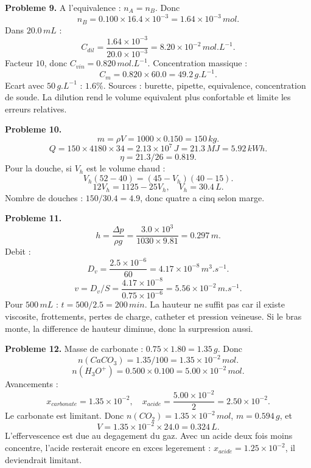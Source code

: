 \documentclass[11pt,a4paper]{article}
\begin{document}
\begin{corrige}
\textbf{Probleme 9.}
A l'equivalence : \(n_A=n_B\). Donc
\[
n_B=0.100\times16.4\times10^{-3}=1.64\times10^{-3}\,mol.
\]
Dans \(20.0\,mL\) :
\[
C_{dil}=\frac{1.64\times10^{-3}}{20.0\times10^{-3}}=8.20\times10^{-2}\,mol.L^{-1}.
\]
Facteur \(10\), donc \(C_{vin}=0.820\,mol.L^{-1}\). Concentration massique :
\[
C_m=0.820\times60.0=49.2\,g.L^{-1}.
\]
Ecart avec \(50\,g.L^{-1}\) : \(1.6\%\). Sources : burette, pipette, equivalence, concentration de soude. La dilution rend le volume equivalent plus confortable et limite les erreurs relatives.
\end{corrige}

\begin{corrige}
\textbf{Probleme 10.}
\[
m=\rho V=1000\times0.150=150\,kg.
\]
\[
Q=150\times4180\times34=2.13\times10^7\,J=21.3\,MJ=5.92\,kWh.
\]
\[
\eta=21.3/26=0.819.
\]
Pour la douche, si \(V_h\) est le volume chaud :
\[
V_h(52-40)=(45-V_h)(40-15).
\]
\[
12V_h=1125-25V_h,\quad V_h=30.4\,L.
\]
Nombre de douches : \(150/30.4=4.9\), donc quatre a cinq selon marge.
\end{corrige}

\begin{corrige}
\textbf{Probleme 11.}
\[
h=\frac{\Delta p}{\rho g}=\frac{3.0\times10^3}{1030\times9.81}=0.297\,m.
\]
Debit :
\[
D_v=\frac{2.5\times10^{-6}}{60}=4.17\times10^{-8}\,m^3.s^{-1}.
\]
\[
v=D_v/S=\frac{4.17\times10^{-8}}{0.75\times10^{-6}}=5.56\times10^{-2}\,m.s^{-1}.
\]
Pour \(500\,mL\) : \(t=500/2.5=200\,min\). La hauteur ne suffit pas car il existe viscosite, frottements, pertes de charge, catheter et pression veineuse. Si le bras monte, la difference de hauteur diminue, donc la surpression aussi.
\end{corrige}

\begin{corrige}
\textbf{Probleme 12.}
Masse de carbonate : \(0.75\times1.80=1.35\,g\). Donc
\[
n(CaCO_3)=1.35/100=1.35\times10^{-2}\,mol.
\]
\[
n(H_3O^+)=0.500\times0.100=5.00\times10^{-2}\,mol.
\]
Avancements :
\[
x_{carbonate}=1.35\times10^{-2},\quad x_{acide}=\frac{5.00\times10^{-2}}{2}=2.50\times10^{-2}.
\]
Le carbonate est limitant. Donc \(n(CO_2)=1.35\times10^{-2}\,mol\), \(m=0.594\,g\), et
\[
V=1.35\times10^{-2}\times24.0=0.324\,L.
\]
L'effervescence est due au degagement du gaz. Avec un acide deux fois moins concentre, l'acide resterait encore en exces legerement : \(x_{acide}=1.25\times10^{-2}\), il deviendrait limitant.
\end{corrige}
\end{document}
